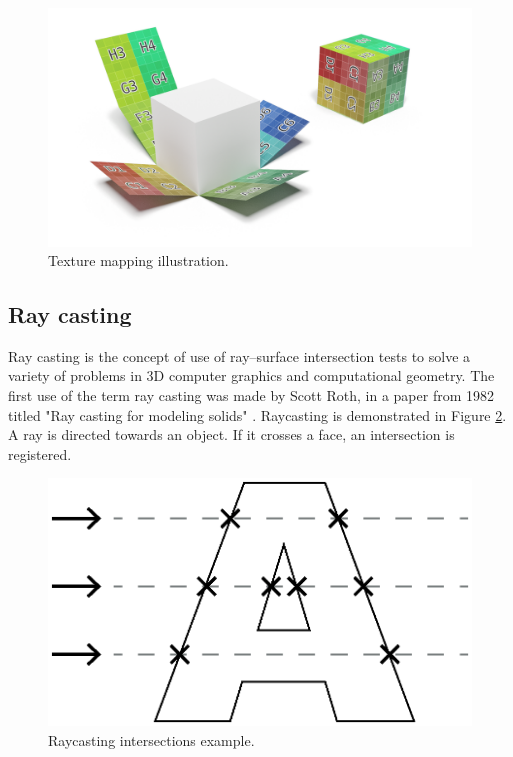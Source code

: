 \begin{figure}[h]
    \centering
    \includegraphics[width=\textwidth]{sections/theory/figures/texture-mapping.png}
    \caption{Texture mapping illustration.}
    \label{fig:texture-mapping}
\end{figure}

\subsection{Ray casting}
Ray casting is the concept of use of ray–surface intersection tests to solve a variety of problems in 3D computer graphics and computational geometry. 
The first use of the term ray casting was made by Scott Roth, in a paper from 1982 titled "Ray casting for modeling solids" \cite{roth-ray-casting}. Raycasting is demonstrated in Figure \ref{fig:raycasting-intersections-example}. A ray is directed towards an object. If it crosses a face, an intersection is registered.

\begin{figure}[h]
    \centering
    \includegraphics[scale=0.8]{sections/theory/figures/raycast-intersections}
    \caption{Raycasting intersections example.}
    \label{fig:raycasting-intersections-example}
\end{figure}


